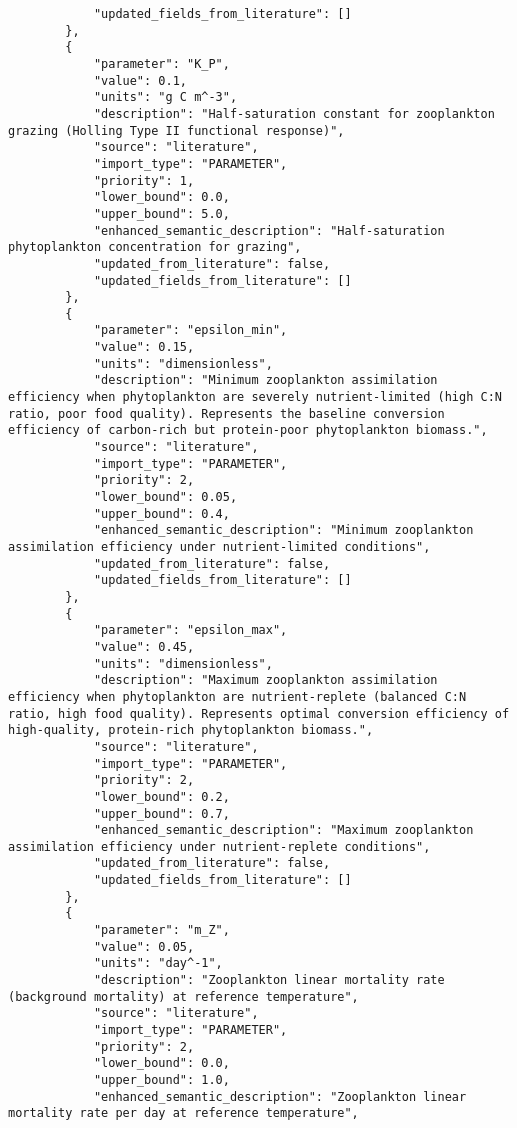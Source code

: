 \begin{lstlisting}
            "updated_fields_from_literature": []
        },
        {
            "parameter": "K_P",
            "value": 0.1,
            "units": "g C m^-3",
            "description": "Half-saturation constant for zooplankton grazing (Holling Type II functional response)",
            "source": "literature",
            "import_type": "PARAMETER",
            "priority": 1,
            "lower_bound": 0.0,
            "upper_bound": 5.0,
            "enhanced_semantic_description": "Half-saturation phytoplankton concentration for grazing",
            "updated_from_literature": false,
            "updated_fields_from_literature": []
        },
        {
            "parameter": "epsilon_min",
            "value": 0.15,
            "units": "dimensionless",
            "description": "Minimum zooplankton assimilation efficiency when phytoplankton are severely nutrient-limited (high C:N ratio, poor food quality). Represents the baseline conversion efficiency of carbon-rich but protein-poor phytoplankton biomass.",
            "source": "literature",
            "import_type": "PARAMETER",
            "priority": 2,
            "lower_bound": 0.05,
            "upper_bound": 0.4,
            "enhanced_semantic_description": "Minimum zooplankton assimilation efficiency under nutrient-limited conditions",
            "updated_from_literature": false,
            "updated_fields_from_literature": []
        },
        {
            "parameter": "epsilon_max",
            "value": 0.45,
            "units": "dimensionless",
            "description": "Maximum zooplankton assimilation efficiency when phytoplankton are nutrient-replete (balanced C:N ratio, high food quality). Represents optimal conversion efficiency of high-quality, protein-rich phytoplankton biomass.",
            "source": "literature",
            "import_type": "PARAMETER",
            "priority": 2,
            "lower_bound": 0.2,
            "upper_bound": 0.7,
            "enhanced_semantic_description": "Maximum zooplankton assimilation efficiency under nutrient-replete conditions",
            "updated_from_literature": false,
            "updated_fields_from_literature": []
        },
        {
            "parameter": "m_Z",
            "value": 0.05,
            "units": "day^-1",
            "description": "Zooplankton linear mortality rate (background mortality) at reference temperature",
            "source": "literature",
            "import_type": "PARAMETER",
            "priority": 2,
            "lower_bound": 0.0,
            "upper_bound": 1.0,
            "enhanced_semantic_description": "Zooplankton linear mortality rate per day at reference temperature",

\end{lstlisting}
